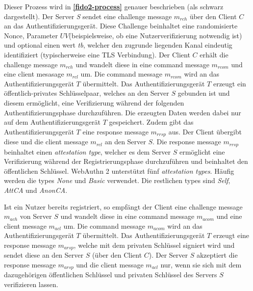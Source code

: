 Dieser Prozess wird in \textbf{\ref{fido2-process}} genauer beschrieben (als schwarz dargestellt). Der Server \textit{S} sendet eine challenge message $m_{rch}$ über den Client $C$ an das Authentifizierungsgerät. Diese Challenge beinhaltet eine randomisierte Nonce, Parameter $UV$(beispielsweise, ob eine Nutzerverifizierung notwendig ist) und optional einen wert \textit{tb}, welcher den zugrunde liegenden Kanal eindeutig identifiziert (typischerweise eine \ac{TLS} Verbindung). Der Client $C$ erhält die challenge message $m_{rch}$ und wandelt diese in eine command message $m_{rcom}$ und eine client mesasage $m_{rcl}$ um. Die command message $m_{rcom}$ wird an das Authentifizierungsgerät $T$ übermittelt. Das Authentifizierungsgerät $T$ erzeugt ein öffentlich-privates Schlüsselpaar, welches an den Server $S$ gebunden ist und diesem ermöglicht, eine Verifizierung während der folgenden Authentifizierungsphase durchzuführen. Die erzeugten Daten werden dabei nur auf dem Authentifizierungsgerät $T$ gespeichert. Zudem gibt das Authentifizierungsgerät $T$ eine response message $m_{rrsp}$ aus. Der Client übergibt diese und die client message $m_{rcl}$ an den Server $S$. Die response message $m_{rrsp}$ beinhaltet einen \textit{attestation type}, welcher es dem Server $S$ ermöglicht eine Verifizierung während der Registrierungsphase durchzuführen und beinhaltet den öffentlichen Schlüssel. WebAuthn 2 unterstützt fünf \textit{attestation types}. Häufig werden die types \textit{None} und \textit{Basic} verwendet. Die restlichen types sind \textit{Self}, \textit{AttCA} und \textit{AnonCA}. \cite{bindel2022fido2}

Ist ein Nutzer bereits registriert, so empfängt der Client eine challenge message $m_{ach}$ von Server $S$ und wandelt diese in eine command message $m_{acom}$ und eine client message $m_{acl}$ um. Die command message $m_{acom}$ wird an das Authentifizierungsgerät $T$ übermittelt. Das Authentifizierungsgerät $T$ erzeugt eine response message $m_{arsp}$, welche mit dem privaten Schlüssel signiert wird und sendet diese an den Server $S$ (über den Client $C$). Der Server $S$ akzeptiert die response message $m_{arsp}$ und die client message $m_{acl}$ nur, wenn sie sich mit dem dazugehörigen öffentlichen Schlüssel und privaten Schlüssel des Servers $S$ verifizieren lassen. \cite{bindel2022fido2}

